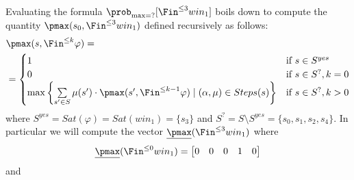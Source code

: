 Evaluating the formula $\prob_{\max=?}[\Fin^{\le 3} win_1]$ boils down to
compute the quantity $\pmax(s_0, \Fin^{\le 3} win_1)$ defined recursively as
follows:
\begin{align*}
	 & \pmax(s, \Fin^{\le k} \varphi) = \\
	 & =
	\begin{cases}
		1
		 & \text{if } s \in S^{yes}    \\
		0
		 & \text{if } s \in S^?, k = 0 \\
		\max \left\{ \sum\limits_{s' \in S} \mu(s') \cdot \pmax(s', \Fin^{\le k-1} \varphi) \mid (\alpha, \mu) \in Steps(s) \right\}
		 & \text{if }s \in S^?, k > 0
	\end{cases}
\end{align*}
where $S^{yes} = Sat(\varphi) = Sat(win_1) = \{ s_3 \}$ and
$S^? = S \setminus S^{yes} = \{ s_0, s_1, s_2, s_4 \}$.
In particular we will compute the vector
$\underline{\pmax}(\Fin^{\le 3} win_1)$ where
\[
	\underline{\pmax}(\Fin^{\le 0} win_1) = \begin{bmatrix} 0 & 0 & 0 & 1 & 0 \end{bmatrix}
\]
and
